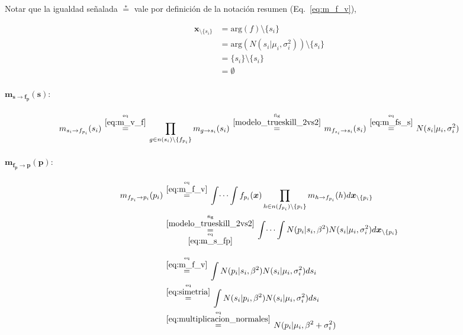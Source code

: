 \documentclass[article]{jss}
\newcommand\hfrac[2]{\genfrac{}{}{0pt}{}{#1}{#2}} %
\begin{document}
\begin{appendix}
Notar que la igualdad se\~nalada $\overset{*}{=}$ vale por definici\'on de la notaci\'on resumen (Eq.~\ref{eq:m_f_v}),

\begin{equation*}
\begin{split}
\bm{x}_{\setminus \{s_i\} } & = \text{arg}(f) \setminus \{s_i\} \\
&= \text{arg}(N(s_i| \mu_i, \sigma_i^2)) \setminus \{s_i\} \\
&= \{s_i\} \setminus \{s_i\} \\
& = \emptyset
\end{split}
\end{equation*}



\paragraph{$\bm{m_{s \rightarrow f_p}(s)}:$}

\begin{equation}\label{eq:m_s_fp}
 m_{s_i \rightarrow f_{p_i}}(s_i) \overset{\hfrac{\text{eq}}{\ref{eq:m_v_f}}}{=} \prod_{g \in n(s_i) \setminus  \{f_{p_i} \}} m_{g \rightarrow s_i} (s_i) \overset{\hfrac{\text{fig}}{\ref{modelo_trueskill_2vs2}}}{=} m_{f_{s_i} \rightarrow s_i}(s_i) \overset{\hfrac{\text{eq}}{\ref{eq:m_fs_s}}}{=}   N(s_i| \mu_i, \sigma_i^2)
\end{equation}



\paragraph{$\bm{m_{f_p \rightarrow p}(p)}:$}

\begin{equation}\label{eq:m_fp_p}
\begin{split}
 m_{f_{p_i} \rightarrow p_i}(p_i) & \overset{\hfrac{\text{eq}}{\ref{eq:m_f_v}}}{=} \int \dots \int f_{p_i}(\bm{x}) \prod_{h \in n(f_{p_i}) \setminus \{p_i\} } m_{h \rightarrow f_{p_i}}(h) d\bm{x}_{\setminus \{p_i\} }  \\
 & \overset{\hfrac{\text{fig}}{\ref{modelo_trueskill_2vs2}}}{\underset{\hfrac{\text{eq}}{\ref{eq:m_s_fp}}}{=}} \int \dots \int N(p_i| s_i, \beta^2) N(s_i| \mu_i, \sigma_i^2) d\bm{x}_{\setminus \{p_i\} } \\[0.3cm]
 & \overset{\hfrac{\text{eq}}{\ref{eq:m_f_v}}}{=} \int N(p_i| s_i, \beta^2) N(s_i| \mu_i, \sigma_i^2) ds_i \\
 & \overset{\hfrac{\text{eq}}{\ref{eq:simetria}}}{=} \int N(s_i|p_i, \beta^2) N(s_i| \mu_i, \sigma_i^2) ds_i \\
& \overset{\hfrac{\text{eq}}{\ref{eq:multiplicacion_normales}}}{=} N(p_i|\mu_i,\beta^2 + \sigma_i^2)
\end{split}
\end{equation}


\end{appendix}
\end{document}
